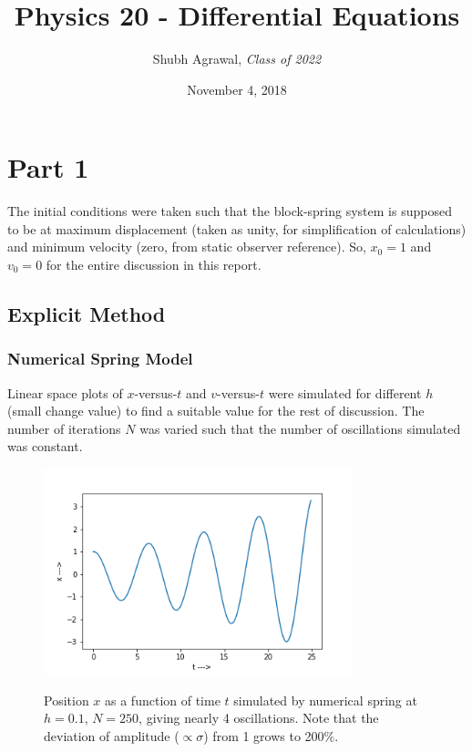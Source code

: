 \documentclass{report}
\title{\Large  Physics 20 - Differential Equations}
\author{\large Shubh Agrawal, \normalsize\emph{Class of 2022}}
\date{\small November 4, 2018}
\begin{document}
\maketitle
\section*{Part 1}
The initial conditions were taken such that the block-spring system is supposed to be at maximum displacement (taken as unity, for simplification of calculations) and minimum velocity (zero, from static observer reference). So, $x_0=1$ and $v_0=0$ for the entire discussion in this report.
\subsection*{Explicit Method}
\subsubsection*{Numerical Spring Model}
Linear space plots of $x$-versus-$t$ and $v$-versus-$t$ were simulated for different  $h$ (small change value) to find a suitable value for the rest of discussion. The number of iterations $N$ was varied such that the number of  oscillations simulated was constant. 
\begin{figure}[H]
	\centering
	\includegraphics[width = 0.8\textwidth]{tXeA.png}
	\label{tXeA}
	\caption{Position $x$ as a function of time $t$ simulated by numerical spring at $h=0.1$, $N=250$, giving nearly 4 oscillations. Note that the deviation of amplitude ($\propto\sigma$) from 1 grows to 200\%.}
\end{figure}
\end{document}
